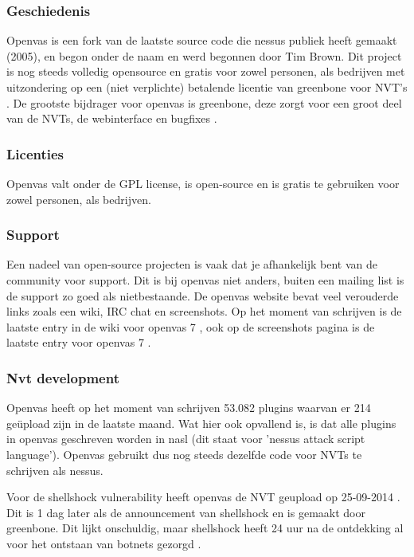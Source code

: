 \subsubsection{Geschiedenis}
Openvas is een fork van de laatste source code die nessus publiek heeft gemaakt (2005), en begon onder de naam \textcite{Securiteam} en werd begonnen door Tim Brown. Dit project is nog steeds volledig opensource \textcite{Openvas-source} en gratis voor zowel personen, als bedrijven met uitzondering op een (niet verplichte) betalende licentie van greenbone voor NVT's \textcite{Openvas-nvt}. De grootste bijdrager voor openvas is greenbone, deze zorgt voor een groot deel van de NVTs, de webinterface en bugfixes \textcite{Openvas-contributors}.

\subsubsection{Licenties}

Openvas valt onder de GPL license, is open-source en is gratis te gebruiken voor zowel personen, als bedrijven.

\subsubsection{Support}
Een nadeel van open-source projecten is vaak dat je afhankelijk bent van de community voor support. Dit is bij openvas niet anders, buiten een mailing list is de support zo goed als nietbestaande. De openvas website bevat veel verouderde links zoals een wiki, IRC chat en screenshots. Op het moment van schrijven is de laatste entry in de wiki voor openvas 7 \textcite{Openvas-wiki}, ook op de screenshots pagina is de laatste entry voor openvas 7 \textcite{Openvas-screenshots}.

\subsubsection{Nvt development}
Openvas heeft op het moment van schrijven 53.082 plugins \textcite{Openvas-nvt} waarvan er 214 geüpload zijn in de laatste maand. Wat hier ook opvallend is, is dat alle plugins in openvas geschreven worden in nasl (dit staat voor 'nessus attack script language'). Openvas gebruikt dus nog steeds dezelfde code voor NVTs te schrijven als nessus. 

Voor de shellshock vulnerability heeft openvas de NVT geupload op 25-09-2014 \textcite{Vulners-shellshock-openvas}. Dit is 1 dag later als de announcement van shellshock en is gemaakt door greenbone. Dit lijkt onschuldig, maar shellshock heeft 24 uur na de ontdekking al voor het ontstaan van botnets gezorgd \textcite{wired-shellshock}. 

